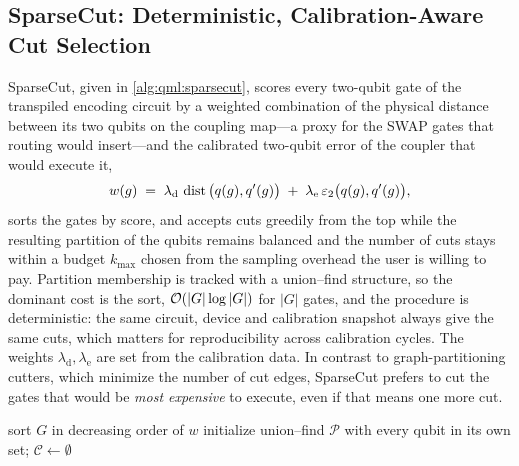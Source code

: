 \subsection{SparseCut: Deterministic, Calibration-Aware Cut Selection}\label{sec:qml:shardq:sparsecut}

SparseCut, given in \cref{alg:qml:sparsecut}, scores every two-qubit gate of the transpiled encoding circuit by a weighted combination of the physical distance between its two qubits on the coupling map---a proxy for the SWAP gates that routing would insert---and the calibrated two-qubit error of the coupler that would execute it,
\begin{equation}\label{eq:qml:sparsecut-score}
w(g) \;=\; \lambda_{\mathrm{d}}\,\operatorname{dist}\big(q(g), q'(g)\big) \;+\; \lambda_{\mathrm{e}}\,\varepsilon_{2}\big(q(g), q'(g)\big),
\end{equation}
sorts the gates by score, and accepts cuts greedily from the top while the resulting partition of the qubits remains balanced and the number of cuts stays within a budget $k_{\max}$ chosen from the sampling overhead the user is willing to pay. Partition membership is tracked with a union--find structure, so the dominant cost is the sort, $\mathcal{O}\!\left(|G| \log |G|\right)$ for $|G|$ gates, and the procedure is deterministic: the same circuit, device and calibration snapshot always give the same cuts, which matters for reproducibility across calibration cycles. The weights $\lambda_{\mathrm{d}}, \lambda_{\mathrm{e}}$ are set from the calibration data. In contrast to graph-partitioning cutters, which minimize the number of cut edges, SparseCut prefers to cut the gates that would be \emph{most expensive} to execute, even if that means one more cut.

\begin{algorithm}[htbp]
\caption{SparseCut: deterministic hardware-aware gate-cut selection (after \cite{guo2025shardq}).}\label{alg:qml:sparsecut}
sort $G$ in decreasing order of $w$ 
initialize union--find $\mathcal{P}$ with every qubit in its own set; $\mathcal{C} \leftarrow \emptyset$\;
\end{algorithm}

